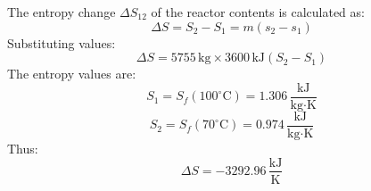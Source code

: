 The entropy change \( \Delta S_{12} \) of the reactor contents is calculated as:  
\[
\Delta S = S_2 - S_1 = m \left( s_2 - s_1 \right)
\]  
Substituting values:  
\[
\Delta S = 5755 \, \text{kg} \times 3600 \, \text{kJ} \left( S_2 - S_1 \right)
\]  
The entropy values are:  
\[
S_1 = S_f \left( 100^\circ \text{C} \right) = 1.306 \, \frac{\text{kJ}}{\text{kg·K}}
\]  
\[
S_2 = S_f \left( 70^\circ \text{C} \right) = 0.974 \, \frac{\text{kJ}}{\text{kg·K}}
\]  
Thus:  
\[
\Delta S = -3292.96 \, \frac{\text{kJ}}{\text{K}}
\]